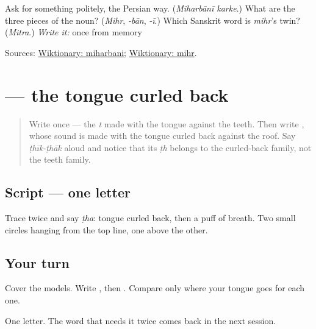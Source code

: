 \begin{tcolorbox}[breakable,colback=teal!4,colframe=teal!35!black,title={Before you move on}]
Ask for something politely, the Persian way. (\emph{Miharbānī karke}.) What are the three pieces of the noun? (\emph{Mihr}, \emph{-bān}, \emph{-ī}.) Which Sanskrit word is \emph{mihr}'s twin? (\emph{Mitra}.) \emph{Write it:} \textbf{} once from memory

Sources: \href{https://en.wiktionary.org/wiki/\%E0\%A8\%AE\%E0\%A8\%BF\%E0\%A8\%B9\%E0\%A8\%B0\%E0\%A8\%AC\%E0\%A8\%BE\%E0\%A8\%A8\%E0\%A9\%80}{Wiktionary: miharbani}; \href{https://en.wiktionary.org/wiki/\%D9\%85\%D9\%87\%D8\%B1}{Wiktionary: mihr}.
\end{tcolorbox}
\section[\texorpdfstring{\pa{ਠ} (ttha)}{ਠ (ttha)}]{ — the tongue curled back}

\label{lesson:PA-W09-thattha}



\begin{quote}
Write \textbf{} once — the \emph{t} made with the tongue against the teeth. Then write \textbf{}, whose sound is made with the tongue curled back against the roof. Say \emph{ṭhīk-ṭhāk} aloud and notice that its \emph{ṭh} belongs to the curled-back family, not the teeth family.
\end{quote}

\subsection*{Script — one letter}

Trace \textbf{} twice and say \emph{ṭha}: tongue curled back, then a puff of breath. Two small circles hanging from the top line, one above the other.

\subsection*{Your turn}
Cover the models. Write \textbf{}, then \textbf{}. Compare only where your tongue goes for each one.

\begin{tcolorbox}[breakable,colback=teal!4,colframe=teal!35!black,title={Before you move on}]
One letter. The word that needs it twice comes back in the next session.
\end{tcolorbox}
